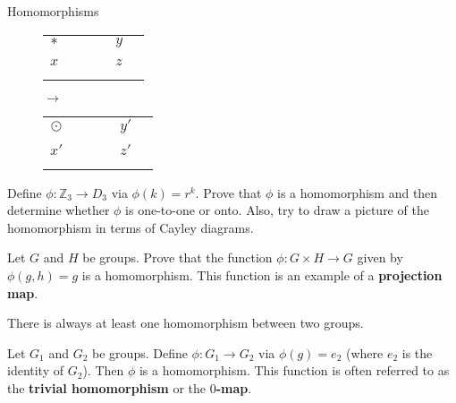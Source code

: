 \begin{section}{Homomorphisms}
\begin{figure}
\begin{center}
\begin{tabular}{c!{\vrule width 2pt}ccc|c|c}
$*$                & & & & $y$  & \\ 
                   & & & &                       & \\ \hline
{}$x$ & & & & $z$ & \\ \hline
                   & & & &                      & \\
                   & & & &                      &
\end{tabular}
\hspace{1cm}
$\longrightarrow$
\hspace{1cm}
\begin{tabular}{c!{\vrule width 2pt}ccc|c|c}
$\odot$                & & & & $y'$  & \\ 
                   & & & &                       & \\ \hline
{}$x'$ & & & & $z'$ & \\ \hline
                   & & & &                      & \\
                   & & & &                      &
\end{tabular}
\end{center}
\caption{}\label{fig:isoGroupTables2}
\end{figure}

\begin{problem}\label{prob:homomorphism}
Define $\phi:\mathbb{Z}_3\to D_3$ via $\phi(k)=r^k$. Prove that $\phi$ is a homomorphism and then determine whether $\phi$ is one-to-one or onto. Also, try to draw a picture of the homomorphism in terms of Cayley diagrams.
\end{problem}

\begin{problem}
Let $G$ and $H$ be groups. Prove that the function $\phi:G\times H\to G$ given by $\phi(g,h)=g$ is a homomorphism. This function is an example of a \textbf{projection map}.
\end{problem}

There is always at least one homomorphism between two groups.

\begin{theorem}\label{thm:trivial_homomorphism}
Let $G_1$ and $G_2$ be groups. Define $\phi:G_1\to G_2$ via $\phi(g)=e_2$ (where $e_2$ is the identity of $G_2$).  Then $\phi$ is a homomorphism. This function is often referred to as the \textbf{trivial homomorphism} or the \textbf{$0$-map}.
\end{theorem}


\end{section}
